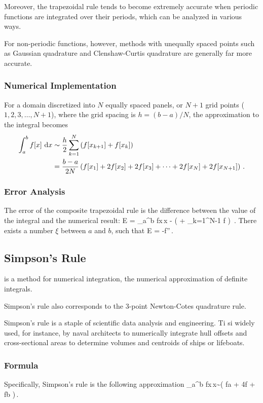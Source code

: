Moreover, the trapezoidal rule tends to become extremely accurate when periodic functions are integrated over their periods, which can be analyzed in various ways.

For non-periodic functions, however, methods with unequally spaced points such as Gaussian quadrature and Clenshaw-Curtis quadrature are generally far more accurate.


\subsubsection{Numerical Implementation}
For a domain discretized into $N$ equally spaced panels, or $N+1$ grid points ($1,2,3,\dotsc,N+1$), where the grid spacing is $h = (b-a)/N$, the approximation to the integral becomes
\begin{align*}
\int_a^b f\vat x\,\dx x 
    &\sim \dfrac{h}{2}\sum_{k = 1}^{N}\left(f\vat{x_{k+1}} + f\vat{x_k} \right) \\
    &= \dfrac{b-a}{2N}\left( f\vat{x_1} + 2f\vat{x_2} + 2f\vat{x_3} + \dotsb + 2f\vat{x_N} + 2f\vat{x_{N+1}} \right) \,.
\end{align*}


\subsubsection{Error Analysis}
The error of the composite trapezoidal rule is the difference between the value of the integral and the numerical result:
\beq
E = \int_a^b f\vat x\,\dx x - 
    \left( + \sum_{k=1}^{N-1} f
    \right) \,.
\eeq
There exists a number $\xi$ between $a$ and $b$, such that
\beq
E = -f''\vat\xi\,.
\eeq


\subsection{Simpson's Rule}
 is a method for numerical integration, the numerical approximation of definite integrals.

Simpson's rule also corresponds to the 3-point Newton-Cotes quadrature rule.

Simpson's rule is a staple of scientific data analysis and engineering. Ti si widely used, for instance, by naval architects to numerically integrate hull offsets and cross-sectional areas to determine volumes and centroids of ships or lifeboats.


\subsubsection{Formula}
Specifically, Simpson's rule is the following approximation
\beq
\int_a^b f\vat x\,\dx x\sim {}\left( f\vat a + 4f + f\vat b \right)\,.
\eeq


